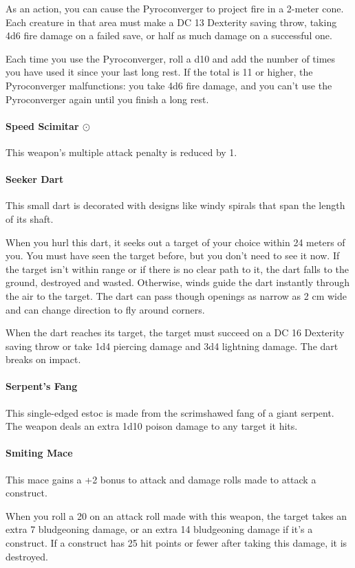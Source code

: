         As an action, you can cause the Pyroconverger to project fire in a 2-meter cone.
        Each creature in that area must make a DC 13 Dexterity saving throw, taking 4d6 fire damage on a failed save, or half as much damage on a successful one.

        Each time you use the Pyroconverger, roll a d10 and add the number of times you have used it since your last long rest.
        If the total is 11 or higher, the Pyroconverger malfunctions: you take 4d6 fire damage, and you can't use the Pyroconverger again until you finish a long rest.
    \paragraph{Speed Scimitar $\odot$}
        This weapon's multiple attack penalty is reduced by 1.
    \paragraph{Seeker Dart}
        This small dart is decorated with designs like windy spirals that span the length of its shaft.

        When you hurl this dart, it seeks out a target of your choice within 24 meters of you.
        You must have seen the target before, but you don't need to see it now.
        If the target isn't within range or if there is no clear path to it, the dart falls to the ground, destroyed and wasted.
        Otherwise, winds guide the dart instantly through the air to the target.
        The dart can pass though openings as narrow as 2 cm wide and can change direction to fly around corners.

        When the dart reaches its target, the target must succeed on a DC 16 Dexterity saving throw or take 1d4 piercing damage and 3d4 lightning damage.
        The dart breaks on impact.
    \paragraph{Serpent's Fang}
        This single-edged estoc is made from the scrimshawed fang of a giant serpent.
        The weapon deals an extra 1d10 poison damage to any target it hits.
    \paragraph{Smiting Mace}
        This mace gains a +2 bonus to attack and damage rolls made to attack a construct.

        When you roll a 20 on an attack roll made with this weapon, the target takes an extra 7 bludgeoning damage, or an extra 14 bludgeoning damage if it's a construct.
        If a construct has 25 hit points or fewer after taking this damage, it is destroyed.
